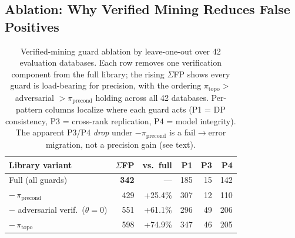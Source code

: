 
\subsection{Ablation: Why Verified Mining Reduces False Positives}
\label{subsec:verified-mining-ablation}

\begin{table}[t]
\centering
\small
\setlength{\tabcolsep}{5pt}
\caption{Verified-mining guard ablation by leave-one-out over 42 evaluation databases. Each row removes one verification component from the full library; the rising $\Sigma$FP shows every guard is load-bearing for precision, with the ordering $\pi_{\text{topo}}>$ adversarial $>\pi_{\text{precond}}$ holding across all 42 databases. Per-pattern columns localize where each guard acts (P1 = DP consistency, P3 = cross-rank replication, P4 = model integrity). The apparent P3/P4 \emph{drop} under $-\pi_{\text{precond}}$ is a fail$\to$error migration, not a precision gain (see text).}
\label{tab:verified-mining-ablation}
\begin{tabular}{@{}lrrrrr@{}}
\toprule
\textbf{Library variant} & \textbf{$\Sigma$FP} & \textbf{vs.\ full} & \textbf{P1} & \textbf{P3} & \textbf{P4} \\
\midrule
Full (all guards)                            & \textbf{342} & ---      & 185 & 15 & 142 \\
\quad $-\,\pi_{\text{precond}}$              & 429 & +25.4\% & 307 & 12 & 110 \\
\quad $-$ adversarial verif.\ ($\theta{=}0$) & 551 & +61.1\% & 296 & 49 & 206 \\
\quad $-\,\pi_{\text{topo}}$                 & 598 & +74.9\% & 347 & 46 & 205 \\
\bottomrule
\end{tabular}
\end{table}

